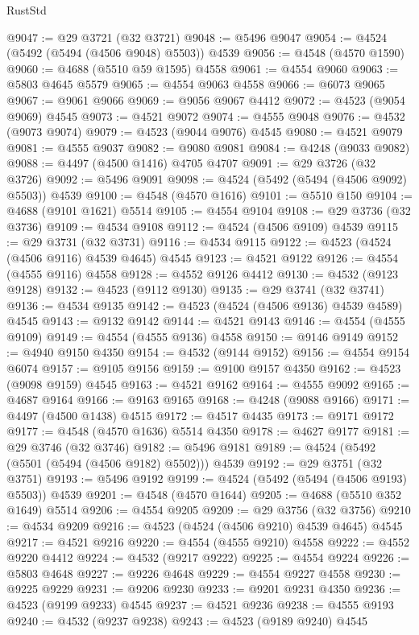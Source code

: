 \begin{lexlean}{RustStd}
\begin{coremodule}
@9047 := @29 @3721 (@32 @3721)
@9048 := @5496 @9047
@9054 := @4524 (@5492 (@5494 (@4506 @9048) @5503)) @4539
@9056 := @4548 (@4570 @1590)
@9060 := @4688 (@5510 @59 @1595) @4558
@9061 := @4554 @9060
@9063 := @5803 @4645 @5579
@9065 := @4554 @9063 @4558
@9066 := @6073 @9065
@9067 := @9061 @9066
@9069 := @9056 @9067 @4412
@9072 := @4523 (@9054 @9069) @4545
@9073 := @4521 @9072
@9074 := @4555 @9048
@9076 := @4532 (@9073 @9074)
@9079 := @4523 (@9044 @9076) @4545
@9080 := @4521 @9079
@9081 := @4555 @9037
@9082 := @9080 @9081
@9084 := @4248 (@9033 @9082)
@9088 := @4497 (@4500 @1416) @4705 @4707
@9091 := @29 @3726 (@32 @3726)
@9092 := @5496 @9091
@9098 := @4524 (@5492 (@5494 (@4506 @9092) @5503)) @4539
@9100 := @4548 (@4570 @1616)
@9101 := @5510 @150
@9104 := @4688 (@9101 @1621) @5514
@9105 := @4554 @9104
@9108 := @29 @3736 (@32 @3736)
@9109 := @4534 @9108
@9112 := @4524 (@4506 @9109) @4539
@9115 := @29 @3731 (@32 @3731)
@9116 := @4534 @9115
@9122 := @4523 (@4524 (@4506 @9116) @4539 @4645) @4545
@9123 := @4521 @9122
@9126 := @4554 (@4555 @9116) @4558
@9128 := @4552 @9126 @4412
@9130 := @4532 (@9123 @9128)
@9132 := @4523 (@9112 @9130)
@9135 := @29 @3741 (@32 @3741)
@9136 := @4534 @9135
@9142 := @4523 (@4524 (@4506 @9136) @4539 @4589) @4545
@9143 := @9132 @9142
@9144 := @4521 @9143
@9146 := @4554 (@4555 @9109)
@9149 := @4554 (@4555 @9136) @4558
@9150 := @9146 @9149
@9152 := @4940 @9150 @4350
@9154 := @4532 (@9144 @9152)
@9156 := @4554 @9154 @6074
@9157 := @9105 @9156
@9159 := @9100 @9157 @4350
@9162 := @4523 (@9098 @9159) @4545
@9163 := @4521 @9162
@9164 := @4555 @9092
@9165 := @4687 @9164
@9166 := @9163 @9165
@9168 := @4248 (@9088 @9166)
@9171 := @4497 (@4500 @1438) @4515
@9172 := @4517 @4435
@9173 := @9171 @9172
@9177 := @4548 (@4570 @1636) @5514 @4350
@9178 := @4627 @9177
@9181 := @29 @3746 (@32 @3746)
@9182 := @5496 @9181
@9189 := @4524 (@5492 (@5501 (@5494 (@4506 @9182) @5502))) @4539
@9192 := @29 @3751 (@32 @3751)
@9193 := @5496 @9192
@9199 := @4524 (@5492 (@5494 (@4506 @9193) @5503)) @4539
@9201 := @4548 (@4570 @1644)
@9205 := @4688 (@5510 @352 @1649) @5514
@9206 := @4554 @9205
@9209 := @29 @3756 (@32 @3756)
@9210 := @4534 @9209
@9216 := @4523 (@4524 (@4506 @9210) @4539 @4645) @4545
@9217 := @4521 @9216
@9220 := @4554 (@4555 @9210) @4558
@9222 := @4552 @9220 @4412
@9224 := @4532 (@9217 @9222)
@9225 := @4554 @9224
@9226 := @5803 @4648
@9227 := @9226 @4648
@9229 := @4554 @9227 @4558
@9230 := @9225 @9229
@9231 := @9206 @9230
@9233 := @9201 @9231 @4350
@9236 := @4523 (@9199 @9233) @4545
@9237 := @4521 @9236
@9238 := @4555 @9193
@9240 := @4532 (@9237 @9238)
@9243 := @4523 (@9189 @9240) @4545

\end{coremodule}
\end{lexlean}
